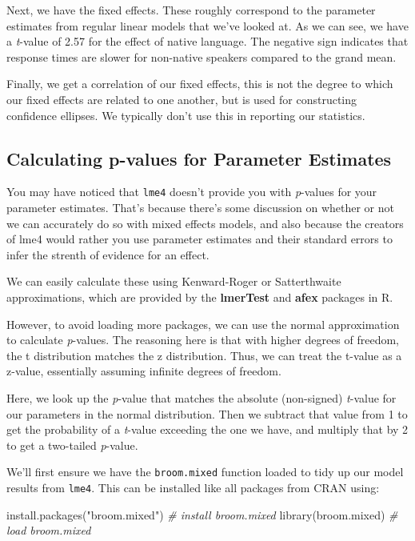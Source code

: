 \documentclass[
]{book}
\newenvironment{Shaded}{\begin{snugshade}}{\end{snugshade}}
\newcommand{\CommentTok}[1]{\textcolor[rgb]{0.56,0.35,0.01}{\textit{#1}}}
\newcommand{\FunctionTok}[1]{\textcolor[rgb]{0.00,0.00,0.00}{#1}}
\newcommand{\NormalTok}[1]{#1}
\newcommand{\StringTok}[1]{\textcolor[rgb]{0.31,0.60,0.02}{#1}}
\begin{document}
Next, we have the fixed effects. These roughly correspond to the parameter estimates from regular linear models that we've looked at. As we can see, we have a \emph{t}-value of 2.57 for the effect of native language. The negative sign indicates that response times are slower for non-native speakers compared to the grand mean.

Finally, we get a correlation of our fixed effects, this is not the degree to which our fixed effects are related to one another, but is used for constructing confidence ellipses. We typically don't use this in reporting our statistics.

\hypertarget{calculating-p-values-for-parameter-estimates}{%
\subsection{Calculating p-values for Parameter Estimates}\label{calculating-p-values-for-parameter-estimates}}

You may have noticed that \texttt{lme4} doesn't provide you with \emph{p}-values for your parameter estimates. That's because there's some discussion on whether or not we can accurately do so with mixed effects models, and also because the creators of lme4 would rather you use parameter estimates and their standard errors to infer the strenth of evidence for an effect.

We can easily calculate these using Kenward-Roger or Satterthwaite approximations, which are provided by the \textbf{lmerTest} and \textbf{afex} packages in R.

However, to avoid loading more packages, we can use the normal approximation to calculate \emph{p}-values. The reasoning here is that with higher degrees of freedom, the t distribution matches the z distribution. Thus, we can treat the t-value as a z-value, essentially assuming infinite degrees of freedom.

Here, we look up the \emph{p}-value that matches the absolute (non-signed) \emph{t}-value for our parameters in the normal distribution. Then we subtract that value from 1 to get the probability of a \emph{t}-value exceeding the one we have, and multiply that by 2 to get a two-tailed \emph{p}-value.

We'll first ensure we have the \texttt{broom.mixed} function loaded to tidy up our model results from \texttt{lme4}. This can be installed like all packages from CRAN using:

\begin{Shaded}
\begin{Highlighting}[]
\FunctionTok{install.packages}\NormalTok{(}\StringTok{"broom.mixed"}\NormalTok{) }\CommentTok{\# install broom.mixed}
\FunctionTok{library}\NormalTok{(broom.mixed) }\CommentTok{\# load broom.mixed}
\end{Highlighting}
\end{Shaded}
\end{document}
